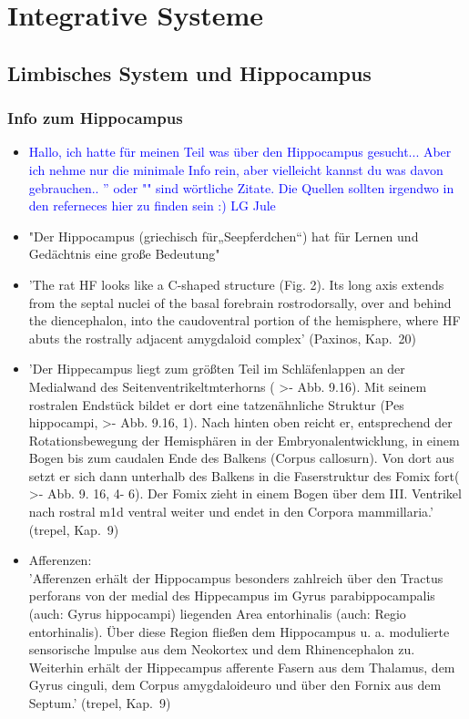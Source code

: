 \documentclass[12pt,a4paper,pdftex]{article}
\begin{document}
\newpage
\section{Integrative Systeme} \label{sec:integrative_systeme}
\subsection{Limbisches System und Hippocampus} \label{subsec:limisches_system}

\subsubsection*{Info zum Hippocampus}

\begin{itemize}

\item \textcolor{blue}{Hallo, ich hatte für meinen Teil was über den Hippocampus gesucht... Aber ich nehme nur die minimale Info rein, aber vielleicht kannst du was davon gebrauchen.. '' oder "" sind wörtliche Zitate. Die Quellen sollten irgendwo in den referneces hier zu finden sein :) LG Jule}

\item "Der Hippocampus (griechisch für„Seepferdchen“) hat für Lernen und Gedächtnis eine große Bedeutung" \cite[Kap.~7]{neurowissenschaften_baer}
	
\item 'The rat HF looks like a C-shaped structure (Fig. 2). Its long axis extends from the septal nuclei of the basal forebrain rostrodorsally, over and behind the diencephalon, into the caudoventral portion of the hemisphere, where HF abuts the rostrally adjacent amygdaloid complex' (Paxinos, Kap.~20)

\item 'Der Hippecampus liegt zum größten Teil im Schläfenlappen an der Medialwand des Seitenventrikeltmterhorns ( >- Abb. 9.16). Mit seinem rostralen Endstück bildet er dort eine tatzenähnliche Struktur (Pes hippocampi, >- Abb. 9.16, 1). Nach hinten oben reicht er, entsprechend der Rotationsbewegung der Hemisphären in der Embryonalentwicklung, in einem Bogen bis zum caudalen Ende des Balkens (Corpus callosurn). Von dort aus setzt er sich dann unterhalb des Balkens in die Faserstruktur
des Fomix fort( >- Abb. 9. 16, 4- 6). Der Fomix zieht in
einem Bogen über dem III. Ventrikel nach rostral m1d ventral weiter und endet in den Corpora mammillaria.' (trepel, Kap.~9)

\item Afferenzen:\\
'Afferenzen erhält der Hippocampus besonders zahlreich über den Tractus perforans von der medial des Hippecampus im Gyrus parabippocampalis (auch: Gyrus hippocampi) liegenden Area entorhinalis (auch: Regio entorhinalis). Über diese Region fließen dem Hippocampus u. a. modulierte sensorische lmpulse aus dem Neokortex und dem Rhinencephalon zu. Weiterhin erhält der Hippecampus afferente Fasern aus dem Thalamus, dem Gyrus cinguli, dem Corpus amygdaloideuro und über den Fornix aus dem Septum.' (trepel, Kap.~9)


\end{itemize}
\end{document}
